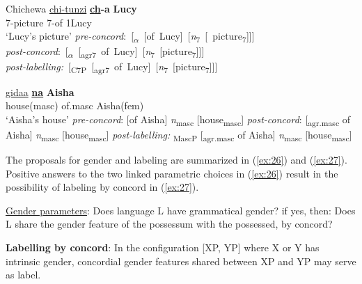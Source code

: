 \documentclass[output=paper
,modfonts
,nonflat]{langsci/langscibook}
\begin{document}
\begin{exe} \settowidth{}
	\ex \label{ex:24}
	\xlist
	\ex Chichewa\label{ex:24a} \newline
	\gll \underline{chi-tunzi}    \textbf{\underline{ch}-a}  \textbf{Lucy} \\
	7-picture    7-of     1Lucy\\
	\glt `Lucy’s picture'  	
	\ex\label{ex:24b} \mbox{\textit{pre-concord}:   [\textsubscript{$\alpha$} [of Lucy] [\textit{n}\textsubscript{7} [ picture\textsubscript{7}]]]}\\  
	\ex\label{ex:24c} \mbox{\textit{post-concord}:   [\textsubscript{$\alpha$} [\textsubscript{agr7} of Lucy] [\textit{n}\textsubscript{7} [picture\textsubscript{7}]]]}\\ 
	\ex\label{ex:24d} \mbox{\textit{post-labelling:} [\textsubscript{C7P} [\textsubscript{agr7} of Lucy] [\textit{n}\textsubscript{7} [picture\textsubscript{7}]]]}\\ 
	\endxlist
\end{exe}
\begin{exe} 
	\ex \label{ex:25}
	\xlist
	\ex 
	\gll \underline{gidaa}    \textbf{\underline{na}}  \textbf{Aisha} \\
	house(masc)   of.masc   Aisha(fem)\\
	\glt `Aisha's house'  	
	\ex \textit{pre-concord}:   {\lbrack}[of Aisha] \textit{n}\textsubscript{masc} [house\textsubscript{masc}]{\rbrack}
	\ex \textit{post-concord}:   {\lbrack}[\textsubscript{agr.masc} of Aisha] \textit{n}\textsubscript{masc} [house\textsubscript{masc}]{\rbrack}
	\ex \textit{post-labelling:} {\lbrack}\textsubscript{MascP} [\textsubscript{agr.masc} of Aisha] \textit{n}\textsubscript{masc} [house\textsubscript{masc}]{\rbrack}
	\endxlist
\end{exe}
The proposals for gender and labeling are summarized in (\ref{ex:26}) and (\ref{ex:27}). Positive answers to the two linked parametric choices in (\ref{ex:26}) result in the possibility of labeling by concord in (\ref{ex:27}). 

\begin{exe}
\ex \label{ex:26} \underline{Gender parameters}:
\xlistt
\ex Does language L have grammatical gender? if yes, then:                   
\ex Does L share the gender feature of the possessum with the possessed, by concord?
\endxlist
\end{exe}
\begin{exe}
\ex \label{ex:27}
\textbf{Labelling by concord}: In the configuration [XP, YP] where X or Y has intrinsic gender, concordial gender features shared between XP and YP may serve as label.
\end{exe}
\end{document}

